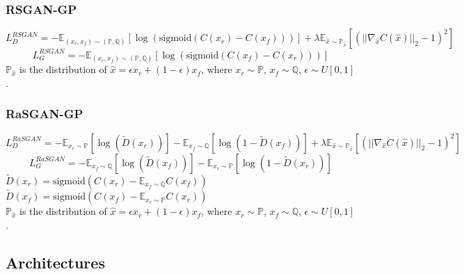 \documentclass{article}
\begin{document}
\subsubsection{RSGAN-GP}

\begin{equation}
L_D^{RSGAN} = -\mathbb{E}_{(x_r,x_f) \sim (\mathbb{P},\mathbb{Q})}\left[ \log (\text{sigmoid}(C(x_r)-C(x_f))) \right] + \lambda \mathbb{E}_{\hat{x} \sim \mathbb{P}_{\hat{x}}} \left[ \left( || \nabla_{\hat{x}} C(\hat{x}) ||_2 - 1 \right)^2 \right]
\end{equation}
\begin{equation}
L_G^{RSGAN} = -\mathbb{E}_{(x_r,x_f) \sim (\mathbb{P},\mathbb{Q})}\left[ \log (\text{sigmoid}(C(x_f)-C(x_r))) \right]
\end{equation}
$\mathbb{P}_{\hat{x}}$ is the distribution of $\hat{x} = \epsilon x_r + (1-\epsilon) x_f$, where $x_r \sim \mathbb{P}$, $x_f \sim \mathbb{Q}$, $\epsilon \sim U[0,1]$.


\subsubsection{RaSGAN-GP}

\begin{equation}
L_D^{RaSGAN} = -\mathbb{E}_{x_r \sim \mathbb{P}}\left[ \log\left( \tilde{D}(x_r) \right) \right] - \mathbb{E}_{x_f \sim \mathbb{Q}} \left[ \log \left( 1 - \tilde{D}(x_f) \right) \right] + \lambda \mathbb{E}_{\hat{x} \sim \mathbb{P}_{\hat{x}}} \left[ \left( || \nabla_{\hat{x}} C(\hat{x}) ||_2 - 1 \right)^2 \right]
\end{equation} 
\begin{equation}
L_G^{RaSGAN} = -\mathbb{E}_{x_f \sim \mathbb{Q}}\left[ \log\left( \tilde{D}(x_f) \right) \right] - \mathbb{E}_{x_r \sim \mathbb{P}} \left[ \log \left( 1 - \tilde{D}(x_r) \right) \right]
\end{equation}
$\tilde{D}(x_r)=\text{sigmoid} \left( C(x_r)-\mathbb{E}_{x_f \sim \mathbb{Q}} C(x_f) \right)$ \\ $ \tilde{D}(x_f)=\text{sigmoid} \left( C(x_f)-\mathbb{E}_{x_r \sim \mathbb{P}} C(x_r) \right)$ \\
$\mathbb{P}_{\hat{x}}$ is the distribution of $\hat{x} = \epsilon x_r + (1-\epsilon) x_f$, where $x_r \sim \mathbb{P}$, $x_f \sim \mathbb{Q}$, $\epsilon \sim U[0,1]$.

\subsection{Architectures}
\end{document}
